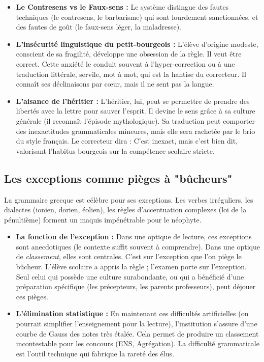 \begin{itemize}\item \textbf{Le Contresens vs le Faux-sens :} Le système distingue des fautes techniques (le contresens, le barbarisme) qui sont lourdement sanctionnées, et des fautes de goût (le faux-sens léger, la maladresse).\item \textbf{L'insécurité linguistique du petit-bourgeois :} L'élève d'origine modeste, conscient de sa fragilité, développe une obsession de la règle. Il veut être \og correct\fg{}. Cette anxiété le conduit souvent à l'hyper-correction ou à une traduction littérale, servile, \og mot à mot\fg{}, qui est la hantise du correcteur.\cite{I-2-3-ref25} Il connaît ses déclinaisons par cœur, mais il \og ne sent pas\fg{} la langue.\item \textbf{L'aisance de l'héritier :} L'héritier, lui, peut se permettre de prendre des libertés avec la lettre pour sauver l'esprit. Il devine le sens grâce à sa culture générale (il reconnaît l'épisode mythologique). Sa traduction peut comporter des inexactitudes grammaticales mineures, mais elle sera rachetée par le \og brio\fg{} du style français. Le correcteur dira : \og C'est inexact, mais c'est bien dit\fg{}, valorisant l'habitus bourgeois sur la compétence scolaire stricte.\end{itemize}

\subsection{Les exceptions comme pièges à "bûcheurs"}

La grammaire grecque est célèbre pour ses exceptions. Les verbes irréguliers, les dialectes (ionien,
dorien, éolien), les règles d'accentuation complexes (loi de la pénultième) forment un maquis
impénétrable pour le néophyte.

\begin{itemize}\item \textbf{La fonction de l'exception :} Dans une optique de lecture, ces exceptions sont anecdotiques (le contexte suffit souvent à comprendre). Dans une optique de \textit{classement}, elles sont centrales. C'est sur l'exception que l'on piège le \og bûcheur\fg{}. L'élève scolaire a appris la règle ; l'examen porte sur l'exception. Seul celui qui possède une culture surabondante, ou qui a bénéficié d'une préparation spécifique (les précepteurs, les parents professeurs), peut déjouer ces pièges.\cite{I-2-3-ref25}\item \textbf{L'élimination statistique :} En maintenant ces difficultés artificielles (on pourrait simplifier l'enseignement pour la lecture), l'institution s'assure d'une courbe de Gauss des notes très étalée. Cela permet de produire un classement incontestable pour les concours (ENS, Agrégation). La difficulté grammaticale est l'outil technique qui fabrique la rareté des élus.\end{itemize}

